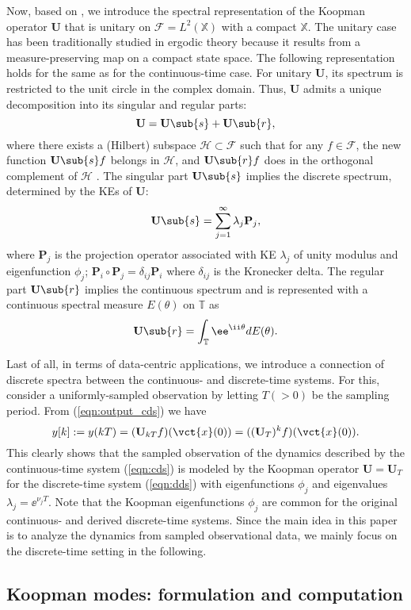 \documentclass[a4paper,10pt]{article}
\def\bU{{\mathbf{U}}}
\def\bP{{\mathbf{P}}}
\def\bbX{{\mathbb{X}}}
\def\cF{{\mathcal{F}}}
\begin{document}
%
Now, based on \cite{Mezic_ND41}, we introduce the spectral representation of the Koopman operator $\bU$ that is unitary on $\cF=L^2(\bbX)$ with a compact $\bbX$.  
The unitary case has been traditionally studied in ergodic theory \cite{Peterson_ET} because it results from a measure-preserving map on a compact state space.  
The following representation holds for the same as for the continuous-time case. 
For unitary $\bU$, its spectrum is restricted to the unit circle in the complex domain.  
Thus, $\bU$ admits a unique decomposition into its singular and regular parts:
\begin{equation}
\bU=\bU\sub{s}+\bU\sub{r},
\label{eqn:sd-unitary}
\end{equation}
where there exists a (Hilbert) subspace $\mathcal{H}\subset\cF$ such that for any $f\in\cF$, the new function $\bU\sub{s}f$ belongs in $\mathcal{H}$, and $\bU\sub{r}f$ does in the orthogonal complement of $\mathcal{H}$ .  
The singular part $\bU\sub{s}$ implies the discrete spectrum, determined by the KEs of $\bU$:
\[
\bU\sub{s}=\sum^{\infty}_{j=1}\lambda_j\bP_j,
\]
where $\bP_j$ is the projection operator associated with KE $\lambda_j$ of unity modulus and eigenfunction $\phi_j$; $\bP_i\circ\bP_j=\delta_{ij}\bP_i$ where $\delta_{ij}$ is the Kronecker delta.  
The regular part $\bU\sub{r}$ implies the continuous spectrum and is represented with a continuous spectral measure $E(\theta)$ on $\mathbb{T}$ as
\[
\bU\sub{r}=\int_\mathbb{T}\ee^{\ii \theta}dE(\theta).
\]

%
Last of all, in terms of data-centric applications, we introduce a connection of discrete spectra between the continuous- and discrete-time systems.  
For this, consider a uniformly-sampled observation by letting $T(>0)$ be the sampling period.  
From (\ref{eqn:output_cds}) we have
\[
y[k]:=y(kT)=(\bU_{kT}f)(\vct{x}(0))=((\bU_T)^kf)(\vct{x}(0)).
\]
This clearly shows that the sampled observation of the dynamics described by the continuous-time system (\ref{eqn:cds}) is modeled by the Koopman operator $\bU=\bU_T$ for the discrete-time system (\ref{eqn:dds}) with eigenfunctions $\phi_j$ and eigenvalues $\lambda_j=\ee^{\nu_jT}$.   
Note that the Koopman eigenfunctions $\phi_j$ are common for the original continuous- and derived discrete-time systems.  
Since the main idea in this paper is to analyze the dynamics from sampled observational data, we mainly focus on the discrete-time setting in the following.  


\subsection{Koopman modes: formulation and computation}
\label{subsec:KM}
\end{document}
